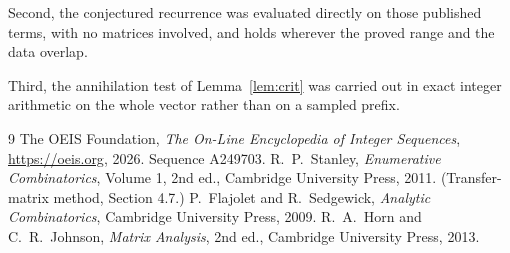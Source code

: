 \documentclass[11pt,a4paper]{article}
\theoremstyle{plain}
\theoremstyle{definition}
\begin{document}
Second, the conjectured recurrence was evaluated directly on those published terms, with no
matrices involved, and holds wherever the proved range and the data overlap.

Third, the annihilation test of Lemma~\ref{lem:crit} was carried out in exact integer
arithmetic on the whole vector rather than on a sampled prefix.

\begin{thebibliography}{9}
 The OEIS Foundation, \emph{The On-Line Encyclopedia of Integer
Sequences}, \url{https://oeis.org}, 2026. Sequence A249703.
 R.~P.~Stanley, \emph{Enumerative Combinatorics}, Volume 1, 2nd ed.,
Cambridge University Press, 2011. (Transfer-matrix method, Section 4.7.)
 P.~Flajolet and R.~Sedgewick, \emph{Analytic Combinatorics}, Cambridge
University Press, 2009.
 R.~A.~Horn and C.~R.~Johnson, \emph{Matrix Analysis}, 2nd ed., Cambridge
University Press, 2013.
\end{thebibliography}
\end{document}
